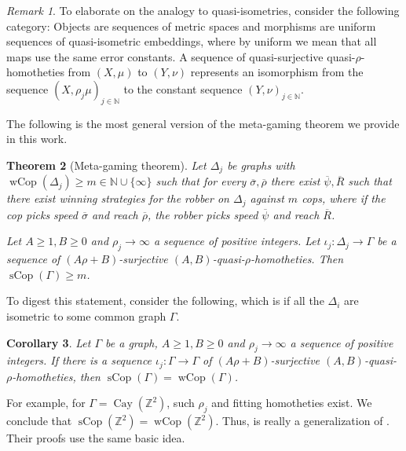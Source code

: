 \documentclass{amsart}
\newtheorem{theorem}{Theorem}[section]
\newtheorem{corollary}[theorem]{Corollary}
\theoremstyle{definition}
\theoremstyle{remark}
\newtheorem{remark}[theorem]{Remark}
\theoremstyle{remark}
\theoremstyle{definition}
\newcommand{\sCop}{\operatorname{sCop}}
\newcommand{\wCop}{\operatorname{wCop}}
\newcommand{\Cay}{\operatorname{Cay}}
\newcommand{\Z}{\mathbb{Z}} %
\renewcommand{\geq}{\geqslant}
\begin{document}
\begin{remark}
	To elaborate on the analogy to quasi-isometries, consider the following category:
	Objects are sequences of metric spaces and morphisms are uniform sequences of quasi-isometric embeddings, where by uniform we mean that all maps use the same error constants.
	A sequence of quasi-surjective quasi-\(\rho\)-homotheties from \((X, \mu)\) to \((Y, \nu)\) represents an isomorphism from the sequence \((X, \rho_j \mu)_{j\in \mathbb{N}}\) to the constant sequence \((Y, \nu)_{j\in\mathbb{N}}\).
\end{remark}

The following is the most general version of the meta-gaming theorem we provide in this work.

\begin{theorem}[Meta-gaming theorem]\label{thm:meta-gaming}
    Let $\Delta_j$ be graphs with $\wCop(\Delta_j) \geq m \in \mathbb{N}\cup \{\infty\}$ such that for every $\overline{\sigma}, \overline{\rho}$ there exist $\overline{\psi}, \overline{R}$ such that there exist winning strategies for the robber on $\Delta_j$ against $m$ cops, where if the cop picks speed \(\overline{\sigma}\) and reach \(\overline{\rho}\), the robber picks speed $\overline{\psi}$ and reach $\overline{R}$. 
    
    Let $A\geq 1, B\geq 0$ and $\rho_j \to \infty$ a sequence of positive integers. Let $\iota_j \colon \Delta_j \to \Gamma$ be a sequence of $(A\rho+B)$-surjective $(A,B)$-quasi-$\rho$-homotheties. Then $\sCop(\Gamma)  \geq m$.
\end{theorem}

To digest this statement, consider the following, which is  if all the \(\Delta_i\) are isometric to some common graph \(\Gamma\).

\begin{corollary}\label{cor:self-meta-gaming}
    Let $\Gamma$ be a graph, $A \geq 1, B\geq 0$ and $\rho_j \to \infty$ a sequence of positive integers. If there is a sequence $\iota_j \colon \Gamma \to \Gamma$ of $(A \rho+B)$-surjective $(A,B)$-quasi-$\rho$-homotheties, then $\sCop(\Gamma) = \wCop(\Gamma)$.
\end{corollary}

For example, for \(\Gamma = \Cay(\Z^2)\), such \(\rho_j\) and fitting homotheties exist. We conclude that \(\sCop(\Z^2) = \wCop(\Z^2)\).
Thus,  is really a generalization of . Their proofs use the same basic idea.
\end{document}
